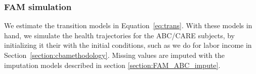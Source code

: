 %
%




\subsubsection{FAM simulation}
\label{appendix:health-fam-simulation}

\noindent We estimate the transition models in Equation~\eqref{eq:trans}. With these models in hand, we simulate the health trajectories for the ABC/CARE subjects, by initializing it their with the initial conditions, such as we do for labor income in Section~\ref{section:cbamethodology}. Missing values are imputed with the imputation models described in section \ref{section:FAM_ABC_impute}.

